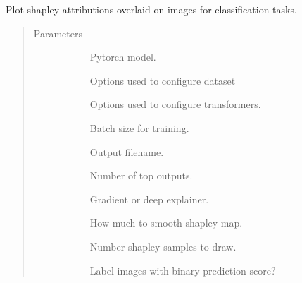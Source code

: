 \documentclass[letterpaper,10pt,english]{sphinxmanual}
\begin{document}

\begin{fulllineitems}
\label{\detokenize{index:pathflowai.visualize.plot_shap}}
Plot shapley attributions overlaid on images for classification tasks.
\begin{quote}\begin{description}
\item[{Parameters}] \leavevmode\begin{description}
\item[{}] \leavevmode
Pytorch model.

\item[{}] \leavevmode
Options used to configure dataset

\item[{}] \leavevmode
Options used to configure transformers.

\item[{}] \leavevmode
Batch size for training.

\item[{}] \leavevmode
Output filename.

\item[{}] \leavevmode
Number of top outputs.

\item[{}] \leavevmode
Gradient or deep explainer.

\item[{}] \leavevmode
How much to smooth shapley map.

\item[{}] \leavevmode
Number shapley samples to draw.

\item[{}] \leavevmode
Label images with binary prediction score?

\end{description}

\end{description}\end{quote}

\end{fulllineitems}
\end{document}
